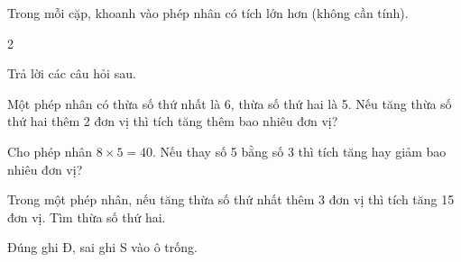 \documentclass[../main.tex]{subfiles}
\begin{document}
\begin{bt}
    Trong mỗi cặp, khoanh vào phép nhân có tích lớn hơn (không cần tính).
    \begin{multicols}{2}
    \begin{listEX}
        \item {}
        \item {}
        \item {}
        \item {}
        \item {}
        \item {}
    \end{listEX}
    \end{multicols}
\end{bt}

\begin{bt}
    Trả lời các câu hỏi sau.
    \begin{listEX}
        \item Một phép nhân có thừa số thứ nhất là 6, thừa số thứ hai là 5. Nếu tăng thừa số thứ hai thêm 2 đơn vị thì tích tăng thêm bao nhiêu đơn vị?
        \item Cho phép nhân $8 \times 5 = 40$. Nếu thay số 5 bằng số 3 thì tích tăng hay giảm bao nhiêu đơn vị?
        \item Trong một phép nhân, nếu tăng thừa số thứ nhất thêm 3 đơn vị thì tích tăng 15 đơn vị. Tìm thừa số thứ hai.
    \end{listEX}
\end{bt}

\begin{bt}
    Đúng ghi Đ, sai ghi S vào ô trống.
    \par\nopagebreak\vspace{4pt}
\end{bt}
\end{document}
